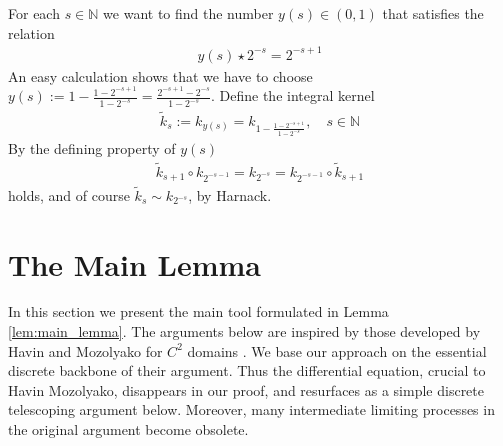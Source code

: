 \documentclass[a4paper,12pt]{article}
\theoremstyle{definition}
\theoremstyle{definition}
\begin{document}
	For each $s\in\mathbb N$ we want to find the number $y(s)\in(0,1)$ that satisfies the relation
	\begin{align*}
		y(s)\star2^{-s}=2^{-s+1}
	\end{align*} 
	An easy calculation shows that we have to choose $y(s):=1-\frac{1-2^{-s+1}}{1-2^{-s}}=\frac{2^{-s+1}-2^{-s}}{1-2^{-s}}$. Define the integral kernel
	\begin{align*}
		\tilde{k}_s:=k_{y(s)}=k_{1-\frac{1-2^{-s+1}}{1-2^{-s}}}, \quad s\in\mathbb N
	\end{align*} 
	By the defining property of $y(s)$
	\begin{align*}
		\tilde{k}_{s+1}\circ k_{2^{-s-1}}=k_{2^{-s}}=k_{2^{-s-1}}\circ \tilde k_{s+1}
	\end{align*}
	holds, and of course $\tilde{k}_s\sim k_{2^{-s}}$, by Harnack. 
	\section{The Main Lemma}\label{sec:Mainlemma}
	In this section we present the main tool formulated in Lemma \ref{lem:main_lemma}. The arguments below are inspired by those developed by Havin and Mozolyako for $C^2$ domains \cite{HavinMozol2016}. We base our approach on the essential discrete backbone of their argument. Thus the differential equation, crucial to Havin Mozolyako, disappears in our proof, and resurfaces as a simple discrete telescoping argument below. Moreover, many intermediate limiting processes in the original argument become obsolete.
\end{document}

